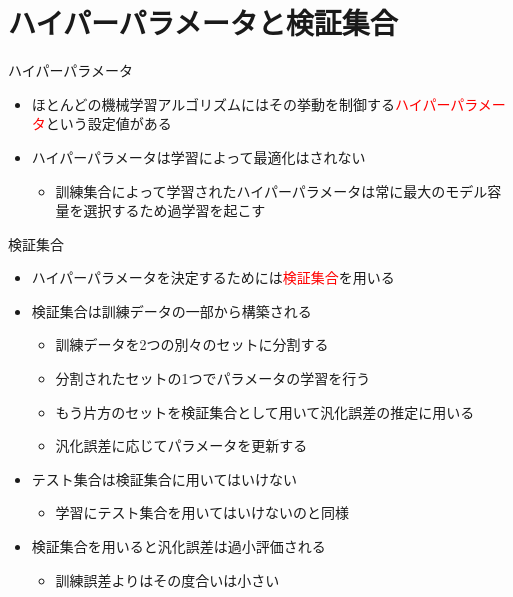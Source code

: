 \documentclass[dvipdfmx, 10pt]{beamer}
\begin{document}

\section{ハイパーパラメータと検証集合}


\begin{frame}{ハイパーパラメータ}
  \begin{itemize}
    \item ほとんどの機械学習アルゴリズムにはその挙動を制御する\textcolor{red}{ハイパーパラメータ}という設定値がある
    \item ハイパーパラメータは学習によって最適化はされない
    \begin{itemize}
      \item 訓練集合によって学習されたハイパーパラメータは常に最大のモデル容量を選択するため過学習を起こす
    \end{itemize}
  \end{itemize}
\end{frame}


\begin{frame}{検証集合}
  \begin{itemize}
    \item ハイパーパラメータを決定するためには\textcolor{red}{検証集合}を用いる
    \item 検証集合は訓練データの一部から構築される
    \begin{itemize}
      \item 訓練データを2つの別々のセットに分割する
      \item 分割されたセットの1つでパラメータの学習を行う
      \item もう片方のセットを検証集合として用いて汎化誤差の推定に用いる
      \item 汎化誤差に応じてパラメータを更新する
    \end{itemize}
    \item テスト集合は検証集合に用いてはいけない
    \begin{itemize}
      \item 学習にテスト集合を用いてはいけないのと同様
    \end{itemize}
    \item 検証集合を用いると汎化誤差は過小評価される
    \begin{itemize}
      \item 訓練誤差よりはその度合いは小さい
    \end{itemize}
  \end{itemize}
\end{frame}
\end{document}
